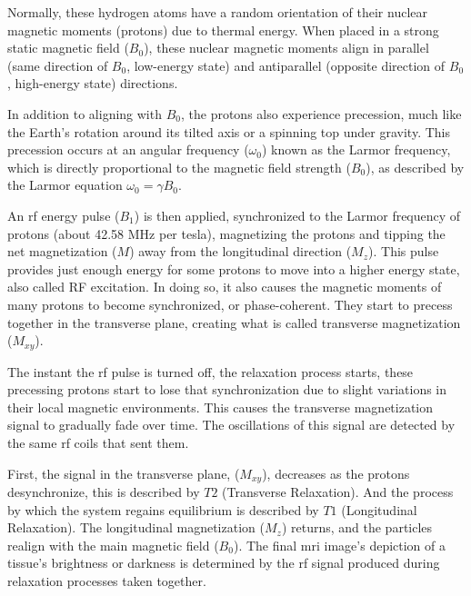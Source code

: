 Normally, these hydrogen atoms have a random orientation of their nuclear magnetic moments (protons) due to thermal energy. When placed in a strong static magnetic field ($B_0$), these nuclear magnetic moments align in parallel (same direction of $B_0$, low-energy state) and antiparallel (opposite direction of $B_0$, high-energy state) directions. 

%

In addition to aligning with $B_0$, the protons also experience precession, much like the Earth’s rotation around its tilted axis or a spinning top under gravity. This precession occurs at an angular frequency ($\omega_0$) known as the Larmor frequency, which is directly proportional to the magnetic field strength ($B_0$), as described by the Larmor equation $\omega_0 = \gamma B_0.$

An \gls{rf} energy pulse ($B_1$) is then applied, synchronized to the Larmor frequency of protons (about 42.58 MHz per tesla), magnetizing the protons and tipping the net magnetization ($M$) away from the longitudinal direction ($M_z$). This pulse provides just enough energy for some protons to move into a higher energy state, also called RF excitation. In doing so, it also causes the magnetic moments of many protons to become synchronized, or phase-coherent. They start to precess together in the transverse plane, creating what is called transverse magnetization ($M_{xy}$).

The instant the \gls{rf} pulse is turned off, the relaxation process starts, these precessing protons start to lose that synchronization due to slight variations in their local magnetic environments. This causes the transverse magnetization signal to gradually fade over time. The oscillations of this signal are detected by the same \gls{rf} coils that sent them. %

First, the signal in the transverse plane, ($M_{xy}$), decreases as the protons desynchronize, this is described by $T2$ (Transverse Relaxation). And the process by which the system regains equilibrium is described by $T1$ (Longitudinal Relaxation).  The longitudinal magnetization ($M_z$) returns, and the particles realign with the main magnetic field ($B_0$). The final \gls{mri} image's depiction of a tissue's brightness or darkness is determined by the \gls{rf} signal produced during relaxation processes taken together.  %


